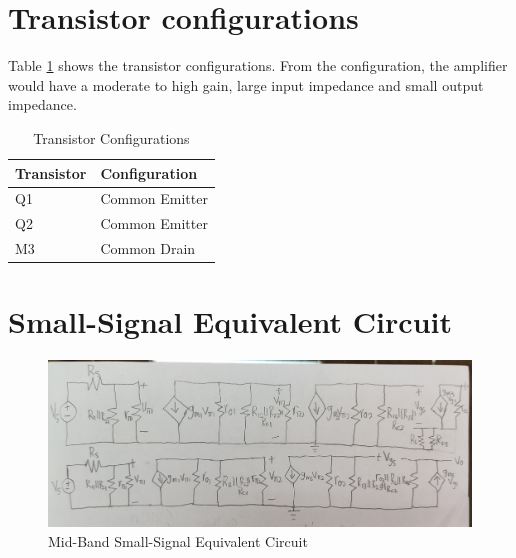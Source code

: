 \documentclass{article}
\begin{document}
\section{Transistor configurations}

Table \ref{tab:transistor-config} shows the transistor configurations.
From the configuration, the amplifier would have a moderate to high gain, large input impedance and small output impedance.

\begin{table}[H]
    \caption{Transistor Configurations}
    \label{tab:transistor-config}
    \centering
    \begin{tabular}{ l l }
        \hline
        Transistor & Configuration  \\
        \hline
        Q1         & Common Emitter \\
        Q2         & Common Emitter \\
        M3         & Common Drain   \\
        \hline
    \end{tabular}
\end{table}

\section{Small-Signal Equivalent Circuit}

\begin{figure}[H]
    \centering
    \includegraphics[height=\linewidth, angle=90]{img/small-signal-equivalent.jpeg}
    \caption{Mid-Band Small-Signal Equivalent Circuit}
    \label{fig:ss-eq-circuit}
\end{figure}
\end{document}
